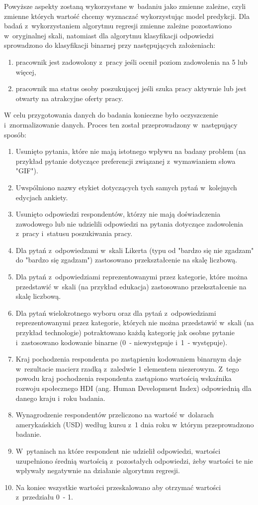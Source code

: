 Powyższe aspekty zostaną wykorzystane w~badaniu jako zmienne zależne, czyli zmienne których wartość chcemy wyznaczać wykorzystując model predykcji.
Dla badań z~wykorzystaniem algorytmu regresji zmienne zależne pozostawiono w~oryginalnej skali,
natomiast dla algorytmu klasyfikacji odpowiedzi sprowadzono do klasyfikacji binarnej przy następujących założeniach:
\begin{enumerate}
    \item pracownik jest zadowolony z~pracy jeśli ocenił poziom zadowolenia na 5 lub więcej,
    \item pracownik ma status osoby poszukującej jeśli szuka pracy aktywnie lub jest otwarty na atrakcyjne oferty pracy.
\end{enumerate}

W celu przygotowania danych do badania konieczne było oczyszczenie i~znormalizowanie danych. Proces ten został przeprowadzony w~następujący sposób:
\begin{enumerate}
    \item Usunięto pytania, które nie mają istotnego wpływu na badany problem (na przykład pytanie dotyczące preferencji związanej z~wymawianiem słowa "GIF").
    \item Uwspólniono nazwy etykiet dotyczących tych samych pytań w~kolejnych edycjach ankiety.
    \item Usunięto odpowiedzi respondentów, którzy nie mają doświadczenia zawodowego lub nie udzielili odpowiedzi na pytania dotyczące zadowolenia z~pracy i~statusu poszukiwania pracy.
    \item Dla pytań z~odpowiedzami w~skali Likerta (typu od "bardzo się nie zgadzam" do "bardzo się zgadzam") zastosowano przekształcenie na skalę liczbową.
    \item Dla pytań z~odpowiedziami reprezentowanymi przez kategorie, które można przedstawić w~skali (na przykład edukacja) zastosowano przekształcenie na skalę liczbową.
    \item Dla pytań wielokrotnego wyboru oraz dla pytań z~odpowiedziami reprezentowanymi przez kategorie, których nie można przedstawić w~skali (na przykład technologie) potraktowano każdą kategorię jak osobne pytanie i~zastosowano kodowanie binarne (0~- niewystępuje i~1~- występuje).
    \item Kraj pochodzenia respondenta po zastąpieniu kodowaniem binarnym daje w~rezultacie macierz rzadką z~zaledwie 1 elementem niezerowym. Z~tego powodu kraj pochodzenia respondenta zastąpiono wartością wskaźnika rozwoju społecznego HDI (ang. Human Development Index) \cite{hdi} odpowiednią dla danego kraju i~roku badania.
    \item Wynagrodzenie respondentów przeliczono na wartość w~dolarach amerykańskich (USD) według kursu z~1 dnia roku w~którym przeprowadzono badanie.
    \item W~pytaniach na które respondent nie udzielił odpowiedzi, wartości uzupełniono średnią wartością z~pozostałych odpowiedzi, żeby wartości te nie wpływały negatywnie na działanie algorytmu regresji.
    \item Na koniec wszystkie wartości przeskalowano aby otrzymać wartości z~przedziału 0~- 1.
\end{enumerate}


